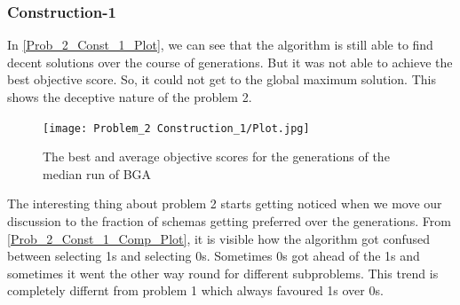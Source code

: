 \documentclass{article}
\begin{document}
\subsubsection{Construction-1}
In \autoref{Prob_2_Const_1_Plot}, we can see that the algorithm is still able to find decent solutions over the course of generations. But it was not able to achieve the best objective score. So, it could not get to the global maximum solution. This shows the deceptive nature of the problem 2.
\begin{figure}[H]
	\centering
	\texttt{[image: Problem\_2 Construction\_1/Plot.jpg]}
	\caption{The best and average objective scores for the generations of the median run of BGA}
	\label{Prob_2_Const_1_Plot}
\end{figure}    

The interesting thing about problem 2 starts getting noticed when we move our discussion to the fraction of schemas getting preferred over the generations. From \autoref{Prob_2_Const_1_Comp_Plot}, it is visible how the algorithm got confused between selecting 1s and selecting 0s. Sometimes 0s got ahead of the 1s and sometimes it went the other way round for different subproblems. This trend is completely differnt from problem 1 which always favoured 1s over 0s. 
\end{document}
